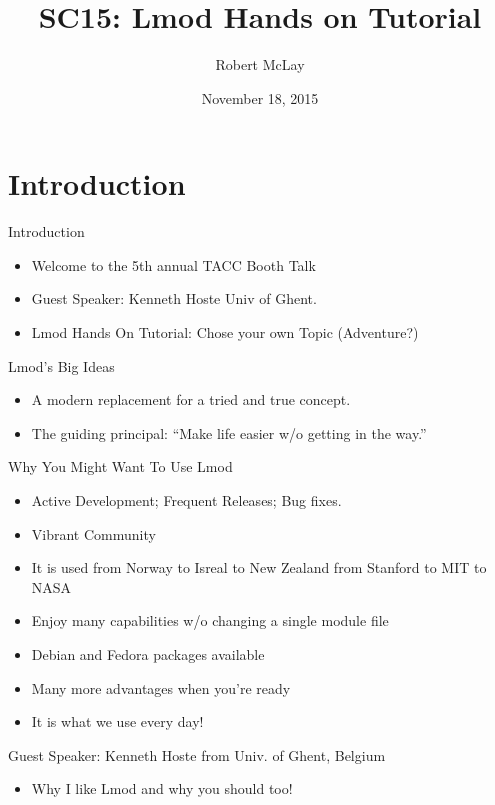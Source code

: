 \documentclass{beamer}
\title{SC15: Lmod Hands on Tutorial}
\author{Robert McLay}
\institute{The Texas Advanced Computing Center}
\date{November 18, 2015}  %
\begin{document}
\begin{frame}
  \titlepage
\end{frame}

\section{Introduction}

\begin{frame}{Introduction}
  \begin{itemize}
    \item Welcome to the 5th annual TACC Booth Talk
    \item Guest Speaker: Kenneth Hoste Univ of Ghent.
    \item Lmod Hands On Tutorial: Chose your own Topic (Adventure?)
  \end{itemize}
\end{frame}

\begin{frame}{Lmod's Big Ideas}
  \begin{itemize}
    \item A modern replacement for a tried and true concept.
    \item The guiding principal: ``Make life easier w/o getting in
      the way.''
  \end{itemize}
\end{frame}

\begin{frame}{Why You Might Want To Use Lmod}
  \begin{itemize}
    \item Active Development;  Frequent Releases; Bug fixes.
    \item Vibrant Community
    \item It is used from Norway to Isreal to New Zealand from Stanford to MIT to NASA
    \item Enjoy many capabilities w/o changing a single module file
    \item Debian and Fedora packages available
    \item Many more advantages when you're ready
    \item It is what we use every day!
  \end{itemize}
\end{frame}

\begin{frame}{Guest Speaker: Kenneth Hoste from Univ. of Ghent, Belgium}
  \begin{itemize}
    \item Why I like Lmod and why you should too!
  \end{itemize}
\end{frame}
\end{document}
